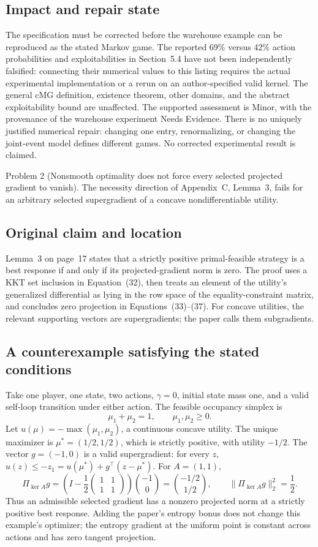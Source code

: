 \documentclass[10pt]{article}
\begin{document}
\subsection*{Impact and repair state}
The specification must be corrected before the warehouse example can be reproduced as the stated Markov game. The reported 69\% versus 42\% action probabilities and exploitabilities in Section 5.4 have not been independently falsified: connecting their numerical values to this listing requires the actual experimental implementation or a rerun on an author-specified valid kernel. The general cMG definition, existence theorem, other domains, and the abstract exploitability bound are unaffected. The supported assessment is Minor, with the provenance of the warehouse experiment Needs Evidence. There is no uniquely justified numerical repair: changing one entry, renormalizing, or changing the joint-event model defines different games. No corrected experimental result is claimed.\par
Problem 2 (Nonsmooth optimality does not force every selected projected gradient to vanish).  The necessity direction of Appendix C, Lemma 3, fails for an arbitrary selected supergradient of a concave nondifferentiable utility.\par
\subsection*{Original claim and location}
Lemma 3 on page 17 states that a strictly positive primal-feasible strategy is a best response if and only if its projected-gradient norm is zero. The proof uses a KKT set inclusion in Equation (32), then treats an element of the utility’s generalized differential as lying in the row space of the equality-constraint matrix, and concludes zero projection in Equations (33)–(37). For concave utilities, the relevant supporting vectors are supergradients; the paper calls them subgradients.\par
\subsection*{A counterexample satisfying the stated conditions}
Take one player, one state, two actions, \(\gamma=0\), initial state mass one, and a valid self-loop transition under either action. The feasible occupancy simplex is \[\mu_1+\mu_2=1,\qquad \mu_1,\mu_2\geq0.\] Let \(u(\mu)=-\max(\mu_1,\mu_2)\), a continuous concave utility. The unique maximizer is \(\mu^*=(1/2,1/2)\), which is strictly positive, with utility \(-1/2\). The vector \(g=(-1,0)\) is a valid supergradient: for every \(z\), \(u(z)\leq-z_1=u(\mu^*)+g^\top(z-\mu^*)\). For \(A=(1,1)\), \[\Pi_{\ker A}g
 =\left(I-\frac12
 \begin{pmatrix}1&1\\1&1\end{pmatrix}\right)
 \binom{-1}{0}
 =\binom{-1/2}{1/2},
 \qquad
 \|\Pi_{\ker A}g\|_2^2=\frac12.\] Thus an admissible selected gradient has a nonzero projected norm at a strictly positive best response. Adding the paper’s entropy bonus does not change this example’s optimizer; the entropy gradient at the uniform point is constant across actions and has zero tangent projection.\par
\end{document}
